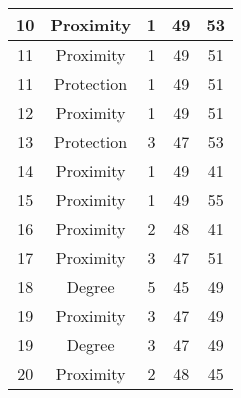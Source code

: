 \documentclass[results.tex]{subfiles}
\begin{document}
\begin{center}
\begin{tabular}{| c || c | c | c | c |}
            \hline
            10                      & Proximity                    & 1                      & 49                      & 53                   \\
            \hline
            11                      & Proximity                    & 1                      & 49                      & 51                   \\
            \hline
            11                      & Protection                   & 1                      & 49                      & 51                   \\
            \hline
            12                      & Proximity                    & 1                      & 49                      & 51                   \\
            \hline
            13                      & Protection                   & 3                      & 47                      & 53                   \\
            \hline
            14                      & Proximity                    & 1                      & 49                      & 41                   \\
            \hline
            15                      & Proximity                    & 1                      & 49                      & 55                   \\
            \hline
            16                      & Proximity                    & 2                      & 48                      & 41                   \\
            \hline
            17                      & Proximity                    & 3                      & 47                      & 51                   \\
            \hline
            18                      & Degree                       & 5                      & 45                      & 49                   \\
            \hline
            19                      & Proximity                    & 3                      & 47                      & 49                   \\
            \hline
            19                      & Degree                       & 3                      & 47                      & 49                   \\
            \hline
            20                      & Proximity                    & 2                      & 48                      & 45                   \\

\end{tabular}
\end{center}
\end{document}
